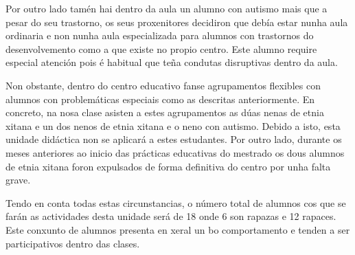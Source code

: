 Por outro lado tamén hai dentro da aula un alumno con autismo mais que a pesar do seu trastorno, os seus proxenitores decidiron que debía estar nunha aula ordinaria e non nunha aula especializada para alumnos con trastornos do desenvolvemento como a que existe no propio centro. Este alumno require especial atención pois é habitual que teña condutas disruptivas dentro da aula.

Non obstante, dentro do centro educativo fanse agrupamentos flexibles con alumnos con problemáticas especiais como as descritas anteriormente. En concreto, na nosa clase asisten a estes agrupamentos as dúas nenas de etnia xitana e un dos nenos de etnia xitana e o neno con autismo. Debido a isto, esta unidade didáctica non se aplicará a estes estudantes. Por outro lado, durante os meses anteriores ao inicio das prácticas educativas do mestrado os dous alumnos de etnia xitana foron expulsados de forma definitiva do centro por unha falta grave.

Tendo en conta todas estas circunstancias, o número total de alumnos cos que se farán as actividades desta unidade será de 18 onde 6 son rapazas e 12 rapaces. Este conxunto de alumnos presenta en xeral un bo comportamento e tenden a ser participativos dentro das clases.

